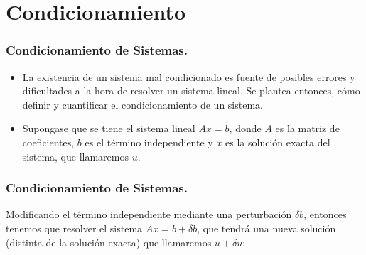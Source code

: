 \documentclass{beamer}
\begin{document}














\section{Condicionamiento}
\frame
{
   \frametitle{Condicionamiento de Sistemas.}
   \begin{itemize}
    \item<1-> La existencia de un sistema mal condicionado es fuente de posibles errores y dificultades a la hora de resolver un sistema lineal. Se plantea entonces, c\'omo definir y cuantificar el condicionamiento de un sistema.
    \item<2-> Supongase que se tiene el sistema lineal $Ax = b$, donde $A$ es la matriz de coeficientes, $b$ es el t\'ermino independiente y $x$ es la soluci\'on exacta del sistema, que llamaremos $u$.
   \end{itemize}
}
\frame
{
\frametitle{Condicionamiento de Sistemas.}
 Modificando el t\'ermino independiente mediante una perturbaci\'on $\delta b$, entonces tenemos que resolver el sistema $Ax = b + \delta b$, que tendr\'a una nueva soluci\'on (distinta de la soluci\'on exacta) que llamaremos $u + \delta u$:

}
\end{document}
